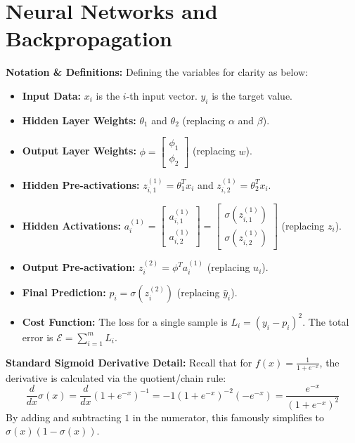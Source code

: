 \documentclass[twoside, 10pt]{article}
\begin{document}
\section{Neural Networks and Backpropagation}
\textbf{Notation \& Definitions:}
Defining the variables for clarity as below:
\begin{itemize}
    \item \textbf{Input Data:} $x_i$ is the $i$-th input vector. $y_i$ is the target value.
    \item \textbf{Hidden Layer Weights:} $\theta_1$ and $\theta_2$ (replacing $\alpha$ and $\beta$).
    \item \textbf{Output Layer Weights:} $\phi = \begin{bmatrix} \phi_1 \\ \phi_2 \end{bmatrix}$ (replacing $w$).
    \item \textbf{Hidden Pre-activations:} $z_{i,1}^{(1)} = \theta_1^T x_i$ and $z_{i,2}^{(1)} = \theta_2^T x_i$.
    \item \textbf{Hidden Activations:} $a_i^{(1)} = \begin{bmatrix} a_{i,1}^{(1)} \\ a_{i,2}^{(1)} \end{bmatrix} = \begin{bmatrix} \sigma(z_{i,1}^{(1)}) \\ \sigma(z_{i,2}^{(1)}) \end{bmatrix}$ (replacing $z_i$).
    \item \textbf{Output Pre-activation:} $z_i^{(2)} = \phi^T a_i^{(1)}$ (replacing $u_i$).
    \item \textbf{Final Prediction:} $p_i = \sigma(z_i^{(2)})$ (replacing $\hat{y}_i$).
    \item \textbf{Cost Function:} The loss for a single sample is $L_i = (y_i - p_i)^2$. The total error is $\mathcal{E} = \sum_{i=1}^m L_i$.
\end{itemize}
\textbf{Standard Sigmoid Derivative Detail:} Recall that for $f(x) = \frac{1}{1 + e^{-x}}$, the derivative is calculated via the quotient/chain rule:
\[ \frac{d}{dx} \sigma(x) = \frac{d}{dx} (1 + e^{-x})^{-1} = -1(1 + e^{-x})^{-2} (-e^{-x}) = \frac{e^{-x}}{(1 + e^{-x})^2} \]
By adding and subtracting $1$ in the numerator, this famously simplifies to $\sigma(x)(1 - \sigma(x))$.
\end{document}
